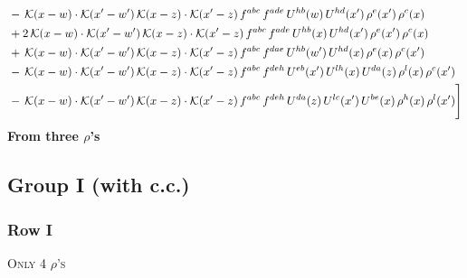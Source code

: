 \documentclass[9pt]{article}
\numberwithin{equation}{section}
\begin{document}
\begin{align}
&-\,\mathcal{K}(x-w)\cdot\mathcal{K}(x'-w')\,\mathcal{K}(x-z)\cdot\mathcal{K}(x'-z)\,f^{abc}\,f^{ade}\,U^{hb}(w)\,U^{hd}(x')\,\rho^{e}(x')\,\rho^{c}(x)\notag\\
&+2\,\mathcal{K}(x-w)\cdot\mathcal{K}(x'-w')\,\mathcal{K}(x-z)\cdot\mathcal{K}(x'-z)\,f^{abc}\,f^{ade}\,U^{hb}(x)\,U^{hd}(x')\,\rho^{e}(x')\,\rho^{c}(x)\notag\\
&+\,\mathcal{K}(x-w)\cdot\mathcal{K}(x'-w')\,\mathcal{K}(x-z)\cdot\mathcal{K}(x'-z)\,f^{abc}\,f^{dae}\,U^{hb}(w')\,U^{hd}(x)\,\rho^{e}(x)\,\rho^{c}(x')\notag\\
&-\,\mathcal{K}(x-w)\cdot\mathcal{K}(x'-w')\,\mathcal{K}(x-z)\cdot\mathcal{K}(x'-z)\,f^{abc}\,f^{deh}\,U^{eb}(x')\,U^{lh}(x)\,U^{da}(z)\,\rho^{l}(x)\,\rho^{c}(x')\notag\\
&-\,\mathcal{K}(x-w)\cdot\mathcal{K}(x'-w')\,\mathcal{K}(x-z)\cdot\mathcal{K}(x'-z)\,f^{abc}\,f^{deh}\,U^{da}(z)\,U^{lc}(x')\,U^{be}(x)\,\rho^{h}(x)\,\rho^{l}(x')\Bigg]
\end{align}
\textbf{From three $\rho$'s}
\subsection{Group I (with c.c.)}
\subsubsection{Row I}
\textsc{Only 4 $\rho$'s}
\end{document}
